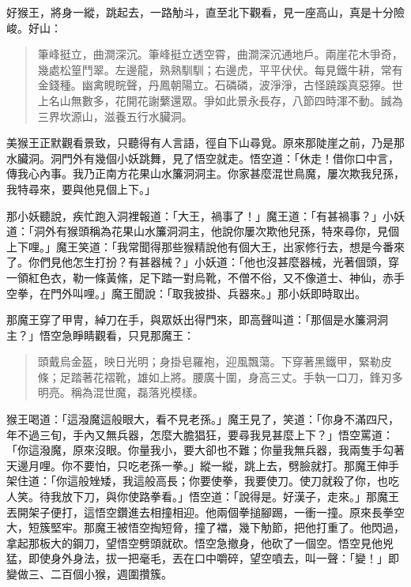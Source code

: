 好猴王，將身一縱，跳起去，一路觔斗，直至北下觀看，見一座高山，真是十分險峻。好山：
\begin{quote}
筆峰挺立，曲澗深沉。筆峰挺立透空霄，曲澗深沉通地戶。兩崖花木爭奇，幾處松篁鬥翠。左邊龍，熟熟馴馴；右邊虎，平平伏伏。每見鐵牛耕，常有金錢種。幽禽睍睆聲，丹鳳朝陽立。石磷磷，波淨淨，古怪蹺蹊真惡獰。世上名山無數多，花開花謝蘩還眾。爭如此景永長存，八節四時渾不動。誠為三界坎源山，滋養五行水臟洞。
\end{quote}

美猴王正默觀看景致，只聽得有人言語，徑自下山尋覓。原來那陡崖之前，乃是那水臟洞。洞門外有幾個小妖跳舞，見了悟空就走。悟空道：「休走！借你口中言，傳我心內事。我乃正南方花果山水簾洞洞主。你家甚麼混世鳥魔，屢次欺我兒孫，我特尋來，要與他見個上下。」

那小妖聽說，疾忙跑入洞裡報道：「大王，禍事了！」魔王道：「有甚禍事？」小妖道：「洞外有猴頭稱為花果山水簾洞洞主，他說你屢次欺他兒孫，特來尋你，見個上下哩。」魔王笑道：「我常聞得那些猴精說他有個大王，出家修行去，想是今番來了。你們見他怎生打扮？有甚器械？」小妖道：「他也沒甚麼器械，光著個頭，穿一領紅色衣，勒一條黃絛，足下踏一對烏靴，不僧不俗，又不像道士、神仙，赤手空拳，在門外叫哩。」魔王聞說：「取我披掛、兵器來。」那小妖即時取出。

那魔王穿了甲冑，綽刀在手，與眾妖出得門來，即高聲叫道：「那個是水簾洞洞主？」悟空急睜睛觀看，只見那魔王：
\begin{quote}
頭戴烏金盔，映日光明；身掛皂羅袍，迎風飄蕩。下穿著黑鐵甲，緊勒皮條；足踏著花褶靴，雄如上將。腰廣十圍，身高三丈。手執一口刀，鋒刃多明亮。稱為混世魔，磊落兇模樣。
\end{quote}

猴王喝道：「這潑魔這般眼大，看不見老孫。」魔王見了，笑道：「你身不滿四尺，年不過三旬，手內又無兵器，怎麼大膽猖狂，要尋我見甚麼上下？」悟空罵道：「你這潑魔，原來沒眼。你量我小，要大卻也不難；你量我無兵器，我兩隻手勾著天邊月哩。你不要怕，只吃老孫一拳。」縱一縱，跳上去，劈臉就打。那魔王伸手架住道：「你這般矬矮，我這般高長；你要使拳，我要使刀。使刀就殺了你，也吃人笑。待我放下刀，與你使路拳看。」悟空道：「說得是。好漢子，走來。」那魔王丟開架子便打，這悟空鑽進去相撞相迎。他兩個拳搥腳踢，一衝一撞。原來長拳空大，短簇堅牢。那魔王被悟空掏短脅，撞了襠，幾下觔節，把他打重了。他閃過，拿起那板大的鋼刀，望悟空劈頭就砍。悟空急撤身，他砍了一個空。悟空見他兇猛，即使身外身法，拔一把毫毛，丟在口中嚼碎，望空噴去，叫一聲：「變！」即變做三、二百個小猴，週圍攢簇。

